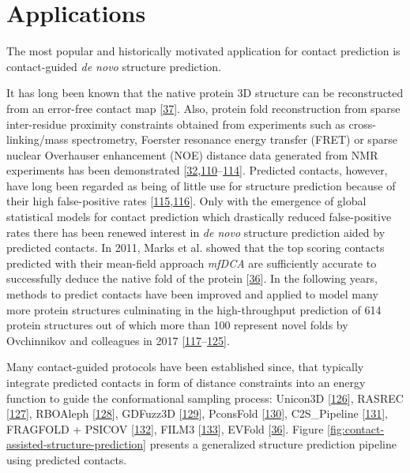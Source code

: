 \documentclass[11pt,a4paper,twoside]{book}
\theoremstyle{definition}
\theoremstyle{definition}
\theoremstyle{remark}
\begin{document}
\section{Applications}\label{application-contact-prediction}

The most popular and historically motivated application for contact
prediction is contact-guided \emph{de novo} structure prediction.

It has long been known that the native protein 3D structure can be
reconstructed from an error-free contact map
{[}\protect\hyperlink{ref-Vendruscolo1997}{37}{]}. Also, protein fold
reconstruction from sparse inter-residue proximity constraints obtained
from experiments such as cross-linking/mass spectrometry, Foerster
resonance energy transfer (FRET) or sparse nuclear Overhauser
enhancement (NOE) distance data generated from NMR experiments has been
demonstrated
{[}\protect\hyperlink{ref-Li2004}{32},\protect\hyperlink{ref-Yu2013}{110}--\protect\hyperlink{ref-Aszodi1995a}{114}{]}.
Predicted contacts, however, have long been regarded as being of little
use for structure prediction because of their high false-positive rates
{[}\protect\hyperlink{ref-Wu2011}{115},\protect\hyperlink{ref-Tress2010}{116}{]}.
Only with the emergence of global statistical models for contact
prediction which drastically reduced false-positive rates there has been
renewed interest in \emph{de novo} structure prediction aided by
predicted contacts. In 2011, Marks et al. showed that the top scoring
contacts predicted with their mean-field approach \emph{mfDCA} are
sufficiently accurate to successfully deduce the native fold of the
protein {[}\protect\hyperlink{ref-Marks2011}{36}{]}. In the following
years, methods to predict contacts have been improved and applied to
model many more protein structures culminating in the high-throughput
prediction of 614 protein structures out of which more than 100
represent novel folds by Ovchinnikov and colleagues in 2017
{[}\protect\hyperlink{ref-Hopf2012}{117}--\protect\hyperlink{ref-Ovchinnikov2017}{125}{]}.

Many contact-guided protocols have been established since, that
typically integrate predicted contacts in form of distance constraints
into an energy function to guide the conformational sampling process:
Unicon3D {[}\protect\hyperlink{ref-Bhattacharya2016}{126}{]}, RASREC
{[}\protect\hyperlink{ref-Braun2015}{127}{]}, RBOAleph
{[}\protect\hyperlink{ref-Mabrouk2015a}{128}{]}, GDFuzz3D
{[}\protect\hyperlink{ref-Pietal2015a}{129}{]}, PconsFold
{[}\protect\hyperlink{ref-Michel2014}{130}{]}, C2S\_Pipeline
{[}\protect\hyperlink{ref-Konopka2014}{131}{]}, FRAGFOLD + PSICOV
{[}\protect\hyperlink{ref-Kosciolek2014}{132}{]}, FILM3
{[}\protect\hyperlink{ref-Nugent2012}{133}{]}, EVFold
{[}\protect\hyperlink{ref-Marks2011}{36}{]}. Figure
\ref{fig:contact-assisted-structure-prediction} presents a generalized
structure prediction pipeline using predicted contacts.
\end{document}
